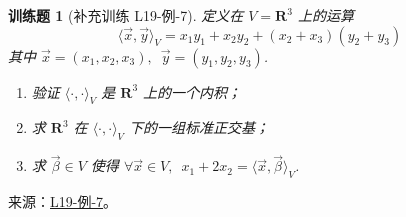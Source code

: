 \documentclass[UTF8,12pt,a4paper,fontset=fandol]{ctexart}
\newtheorem{exercise}{训练题}[section]
\begin{document}
\begin{exercise}[补充训练 L19-例-7]\label{prob:L19-例-7}
定义在 $ V = \mathbf{R}^3 $ 上的运算
    \[ \langle \vec{x}, \vec{y} \rangle_V = x_1 y_1 + x_2 y_2 + (x_2 + x_3)(y_2 + y_3) \]
    其中 $ \vec{x} = (x_1, x_2, x_3),\enspace \vec{y} = (y_1, y_2, y_3) $.
    \begin{enumerate}
        \item 验证 $ \langle \cdot, \cdot \rangle_V $ 是 $ \mathbf{R}^3 $ 上的一个内积；

        \item 求 $ \mathbf{R}^3 $ 在 $ \langle \cdot, \cdot \rangle_V $ 下的一组标准正交基；

        \item 求 $ \vec{\beta} \in V $ 使得 $ \forall \vec{x} \in V,\enspace x_1 + 2x_2 = \langle \vec{x}, \vec{\beta} \rangle_V $.
    \end{enumerate}
\end{exercise}
\noindent 来源：\href{https://github.com/yhwu-is/Linear-Algebra-Left-Undone/blob/new/%E8%AE%B2%E4%B9%89/%E4%B8%93%E9%A2%98/19%20%E5%86%85%E7%A7%AF%E7%A9%BA%E9%97%B4.tex}{L19-例-7}。
\end{document}
